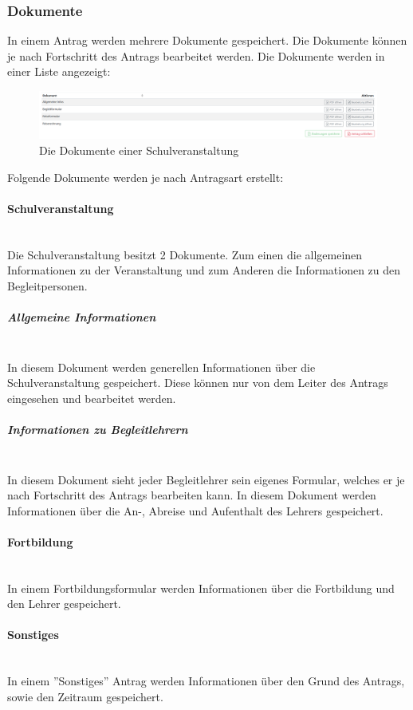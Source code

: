 \subsubsection{Dokumente}
In einem Antrag werden mehrere Dokumente gespeichert. Die Dokumente können je nach Fortschritt des Antrags bearbeitet werden.
Die Dokumente werden in einer Liste angezeigt:
\begin{figure}
	\centering
	\includegraphics[width=1\linewidth]{images/documents}
	\caption[Dokumente eines Antrags]{Die Dokumente einer Schulveranstaltung}
	\label{fig:documents}
\end{figure}

Folgende Dokumente werden je nach Antragsart erstellt:
\paragraph{Schulveranstaltung}~\\
Die Schulveranstaltung besitzt 2 Dokumente. Zum einen die allgemeinen Informationen zu der Veranstaltung und zum Anderen die Informationen zu den Begleitpersonen.
\subparagraph{Allgemeine Informationen}~\\
In diesem Dokument werden generellen Informationen über die Schulveranstaltung gespeichert. Diese können nur von dem Leiter des Antrags eingesehen und bearbeitet werden.
\subparagraph{Informationen zu Begleitlehrern}~\\
In diesem Dokument sieht jeder Begleitlehrer sein eigenes Formular, welches er je nach Fortschritt des Antrags bearbeiten kann. In diesem Dokument werden Informationen über die An-, Abreise und Aufenthalt des Lehrers gespeichert.
\paragraph{Fortbildung}~\\
In einem Fortbildungsformular werden Informationen über die Fortbildung und den Lehrer gespeichert.
\paragraph{Sonstiges}~\\
In einem ''Sonstiges'' Antrag werden Informationen über den Grund des Antrags, sowie den Zeitraum gespeichert.
